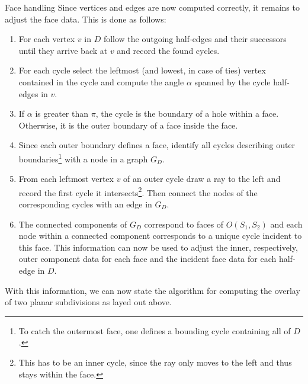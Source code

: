     \begin{outline}{Face handling} 
        Since vertices and edges are now computed correctly, it remains to adjust the face data. This is done as follows:
        \begin{enumerate}
            \item For each vertex $v$ in $D$ follow the outgoing half-edges and their successors until they arrive back at $v$ and record the found cycles. 
            
            \item For each cycle select the leftmost (and lowest, in case of ties) vertex contained in the cycle and compute the angle $\alpha$ spanned by the cycle half-edges in $v$.
            
            \item If $\alpha$ is greater than $\pi$, the cycle is the boundary of a hole within a face. Otherwise, it is the outer boundary of a face inside the face.
            
            \item Since each outer boundary defines a face, identify all cycles describing outer boundaries\footnote{To catch the outermost face, one defines a bounding cycle containing all of $D$.} with a node in a graph $G_D$.
            
            \item From each leftmost vertex $v$ of an outer cycle draw a ray to the left and record the first cycle it intersects\footnote{This has to be an inner cycle, since the ray only moves to the left and thus stays within the face.}. Then connect the nodes of the corresponding cycles with an edge in $G_D$.
            
            \item The connected components of $G_D$ correspond to faces of $O(S_1, S_2)$ and each node within a connected component corresponds to a unique cycle incident to this face. This information can now be used to adjust the inner, respectively, outer component data for each face and the incident face data for each half-edge in $D$.
        \end{enumerate}
    \end{outline}

    With this information, we can now state the algorithm for computing the overlay of two planar subdivisions as layed out above.

